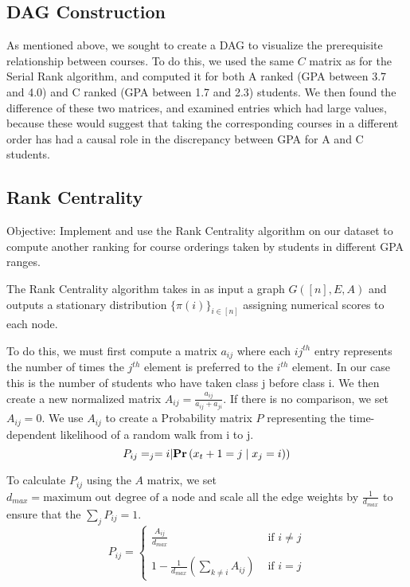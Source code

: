 \documentclass[10pt]{siamltex}
\newcounter{ale}
\def\P(#1){\Phelper#1|\relax\Pchoice(#1)}
\def\Phelper#1|#2\relax{\ifx\relax#2\relax\def\Pchoice{\Pone}\else\def\Pchoice{\Ptwo}\fi}
\def\Pone(#1){\Pr\left( #1 \right)}
\def\Ptwo(#1|#2){\Pr\left( #1 \mid #2 \right)}
\def\Pr{\mathbf{Pr}}
\begin{document}
\begin{pagewiselinenumbers}
\subsection{DAG Construction}
As mentioned above, we sought to create a DAG to visualize the prerequisite relationship between courses. To do this, we used the same $C$ matrix as for the Serial Rank algorithm, and computed it for both A ranked (GPA between 3.7 and 4.0) and C ranked (GPA between 1.7 and 2.3) students. We then found the difference of these two matrices, and examined entries which had large values, because these would suggest that taking the corresponding courses in a different order has had a causal role in the discrepancy between GPA for A and C students.

\subsection{Rank Centrality}

Objective: Implement and use the Rank Centrality algorithm on our dataset to compute another ranking for course orderings taken by students in different GPA ranges. 

The Rank Centrality algorithm takes in as input a graph $G([n],E,A)$ and outputs a stationary distribution $\{\pi(i)\}_{i\in [n]}$ assigning numerical scores to each node.

To do this, we must first compute a matrix $a_{ij}$ where each $ij^{th}$ entry represents the number of times the $j^{th}$ element is preferred to the $i^{th}$ element. In our case this is the number of students who have taken class j before class i. We then create a new normalized matrix $A_{ij} = \frac{a_{ij}}{a_{ij} + a_{ji}}$. If there is no comparison, we set $A_{ij} = 0$. We use $A_{ij}$ to create a Probability matrix $P$ representing the time-dependent likelihood of a random walk from i to j.
$$P_{ij} =  \P (x_{t+1}=j|x_{j}=i))$$

To calculate $P_{ij}$ using the $A$ matrix, we set $d_{max} =\text{maximum out degree of a node}$ and scale all the edge weights by  $\frac{1}{d_{max}}$ to ensure that the $\sum_{j}P_{ij} = 1$.
\begin{equation}
P_{ij} = \left\{
	\begin{array}{rl}
\frac{A_{ij}}{d_{max}}  & \text{ if }i\neq j 	\\
 &  \\
 1 - \frac{1}{d_{max}}(\sum_{k\neq i}A_{ij})  & \text{ if }i = j 
     \end{array}
   \right.
\label{probabilityMatrix}
\end{equation}


\end{pagewiselinenumbers}
\end{document}
